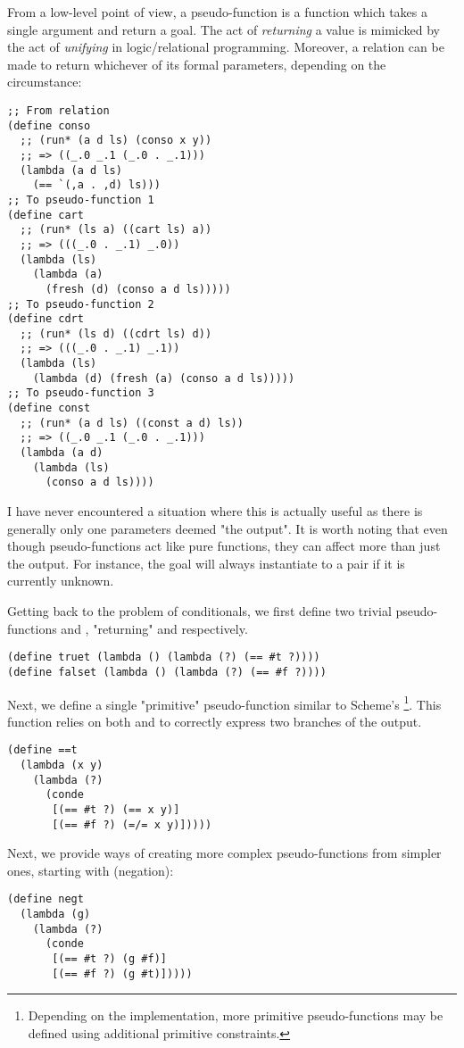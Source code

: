 From a low-level point of view, a pseudo-function is a function which takes a single argument and return a goal. The act of \textit{returning} a value is mimicked by the act of \textit{unifying} in logic/relational programming. Moreover, a relation can be made to return whichever of its formal parameters, depending on the circumstance:
\begin{lstlisting}
;; From relation
(define conso
  ;; (run* (a d ls) (conso x y))
  ;; => ((_.0 _.1 (_.0 . _.1)))
  (lambda (a d ls)
    (== `(,a . ,d) ls)))
;; To pseudo-function 1
(define cart
  ;; (run* (ls a) ((cart ls) a))
  ;; => (((_.0 . _.1) _.0))
  (lambda (ls)
    (lambda (a)
      (fresh (d) (conso a d ls)))))
;; To pseudo-function 2
(define cdrt
  ;; (run* (ls d) ((cdrt ls) d))
  ;; => (((_.0 . _.1) _.1))
  (lambda (ls)
    (lambda (d) (fresh (a) (conso a d ls)))))
;; To pseudo-function 3
(define const
  ;; (run* (a d ls) ((const a d) ls))
  ;; => ((_.0 _.1 (_.0 . _.1)))
  (lambda (a d)
    (lambda (ls)
      (conso a d ls))))
\end{lstlisting}
I have never encountered a situation where this is actually useful as there is generally only one parameters deemed "the output". It is worth noting that even though pseudo-functions act like pure functions, they can affect more than just the output. For instance, the goal  will always instantiate  to a pair if it is currently unknown.

Getting back to the problem of conditionals, we first define two trivial pseudo-functions  and , "returning"  and  respectively.

\begin{lstlisting}
(define truet (lambda () (lambda (?) (== #t ?))))
(define falset (lambda () (lambda (?) (== #f ?))))
\end{lstlisting}

Next, we define a single "primitive" pseudo-function similar to Scheme's \footnote{Depending on the implementation, more primitive pseudo-functions may be defined using additional primitive constraints.}. This function relies on both \code{==} and \code{=/=} to correctly express two branches of the output.
\begin{lstlisting}
(define ==t
  (lambda (x y)
    (lambda (?)
      (conde
       [(== #t ?) (== x y)]
       [(== #f ?) (=/= x y)]))))
\end{lstlisting}

Next, we provide ways of creating more complex pseudo-functions from simpler ones, starting with  (negation):
\begin{lstlisting}
(define negt
  (lambda (g)
    (lambda (?)
      (conde
       [(== #t ?) (g #f)]
       [(== #f ?) (g #t)]))))
\end{lstlisting}


